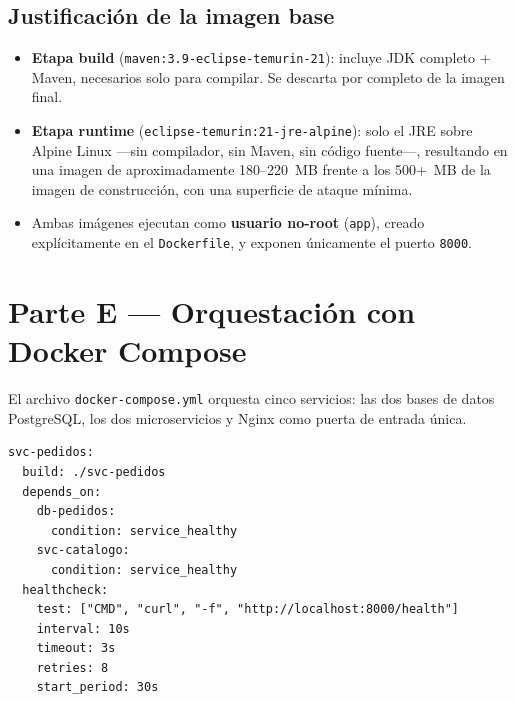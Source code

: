 \documentclass[11pt,a4paper]{article}
\begin{document}
\subsection{Justificación de la imagen base}

\begin{itemize}[leftmargin=2em]
    \item \textbf{Etapa build} (\texttt{maven:3.9-eclipse-temurin-21}): incluye
    JDK completo + Maven, necesarios solo para compilar. Se descarta por completo
    de la imagen final.
    \item \textbf{Etapa runtime} (\texttt{eclipse-temurin:21-jre-alpine}): solo
    el JRE sobre Alpine Linux —sin compilador, sin Maven, sin código fuente—,
    resultando en una imagen de aproximadamente 180--220~MB frente a los
    500+~MB de la imagen de construcción, con una superficie de ataque mínima.
    \item Ambas imágenes ejecutan como \textbf{usuario no-root} (\texttt{app}),
    creado explícitamente en el \texttt{Dockerfile}, y exponen únicamente el
    puerto \texttt{8000}.
\end{itemize}

\section{Parte E — Orquestación con Docker Compose}

El archivo \texttt{docker-compose.yml} orquesta cinco servicios: las dos
bases de datos PostgreSQL, los dos microservicios y Nginx como puerta de
entrada única.

\begin{lstlisting}[language={}, basicstyle=\ttfamily\footnotesize, caption={Extracto de \texttt{docker-compose.yml}: healthchecks encadenados}, label={lst:compose}]
svc-pedidos:
  build: ./svc-pedidos
  depends_on:
    db-pedidos:
      condition: service_healthy
    svc-catalogo:
      condition: service_healthy
  healthcheck:
    test: ["CMD", "curl", "-f", "http://localhost:8000/health"]
    interval: 10s
    timeout: 3s
    retries: 8
    start_period: 30s
\end{lstlisting}
\end{document}
